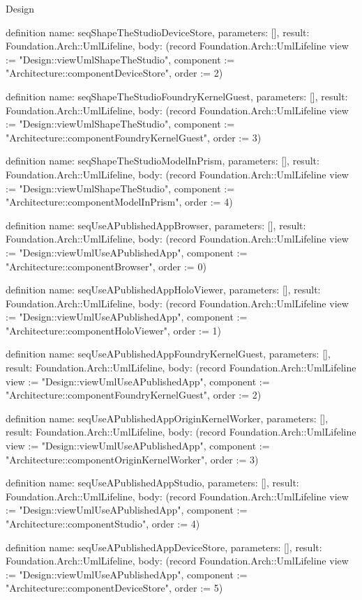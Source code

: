 \begin{lexlean}{Design}
\begin{semanticmodule}
definition{
  name: seqShapeTheStudioDeviceStore,
  parameters: [],
  result: Foundation.Arch::UmlLifeline,
  body: (record Foundation.Arch::UmlLifeline {view := "Design::viewUmlShapeTheStudio", component := "Architecture::componentDeviceStore", order := 2})
}

definition{
  name: seqShapeTheStudioFoundryKernelGuest,
  parameters: [],
  result: Foundation.Arch::UmlLifeline,
  body: (record Foundation.Arch::UmlLifeline {view := "Design::viewUmlShapeTheStudio", component := "Architecture::componentFoundryKernelGuest", order := 3})
}

definition{
  name: seqShapeTheStudioModelInPrism,
  parameters: [],
  result: Foundation.Arch::UmlLifeline,
  body: (record Foundation.Arch::UmlLifeline {view := "Design::viewUmlShapeTheStudio", component := "Architecture::componentModelInPrism", order := 4})
}

definition{
  name: seqUseAPublishedAppBrowser,
  parameters: [],
  result: Foundation.Arch::UmlLifeline,
  body: (record Foundation.Arch::UmlLifeline {view := "Design::viewUmlUseAPublishedApp", component := "Architecture::componentBrowser", order := 0})
}

definition{
  name: seqUseAPublishedAppHoloViewer,
  parameters: [],
  result: Foundation.Arch::UmlLifeline,
  body: (record Foundation.Arch::UmlLifeline {view := "Design::viewUmlUseAPublishedApp", component := "Architecture::componentHoloViewer", order := 1})
}

definition{
  name: seqUseAPublishedAppFoundryKernelGuest,
  parameters: [],
  result: Foundation.Arch::UmlLifeline,
  body: (record Foundation.Arch::UmlLifeline {view := "Design::viewUmlUseAPublishedApp", component := "Architecture::componentFoundryKernelGuest", order := 2})
}

definition{
  name: seqUseAPublishedAppOriginKernelWorker,
  parameters: [],
  result: Foundation.Arch::UmlLifeline,
  body: (record Foundation.Arch::UmlLifeline {view := "Design::viewUmlUseAPublishedApp", component := "Architecture::componentOriginKernelWorker", order := 3})
}

definition{
  name: seqUseAPublishedAppStudio,
  parameters: [],
  result: Foundation.Arch::UmlLifeline,
  body: (record Foundation.Arch::UmlLifeline {view := "Design::viewUmlUseAPublishedApp", component := "Architecture::componentStudio", order := 4})
}

definition{
  name: seqUseAPublishedAppDeviceStore,
  parameters: [],
  result: Foundation.Arch::UmlLifeline,
  body: (record Foundation.Arch::UmlLifeline {view := "Design::viewUmlUseAPublishedApp", component := "Architecture::componentDeviceStore", order := 5})
}


\end{semanticmodule}
\end{lexlean}
